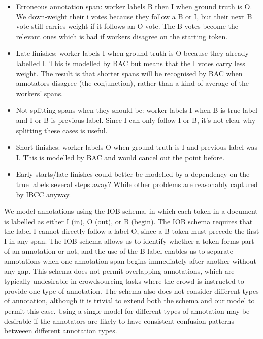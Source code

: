 \begin{itemize}
\item Erroneous annotation span: worker labels B then I when ground truth is O. We down-weight their i votes because they follow a B or I, but their next B vote still carries weight if it follows an O vote. The B votes become the relevant ones which is bad if workers disagree on the starting token.
\item Late finishes: worker labels I when ground truth is O because they already labelled I. This is modelled by BAC but means that the I votes carry less weight. The result is that shorter spans will be recognised by BAC when annotators disagree (the conjunction), 
rather than a kind of average of the workers' spans.
\item Not splitting spans when they should be: worker labels I when B is true label and I or B is previous label. Since I can only follow I or B, it's not clear why splitting these cases is useful.
\item Short finishes: worker labels O when ground truth is I and previous label was I. This is modelled by BAC and would cancel out the point before.
\item Early starts/late finishes could better be modelled by a dependency on the true labels several steps away? While other problems are reasonably captured by IBCC anyway.
\end{itemize}


We model annotations using the IOB schema, in which each token in a document is labelled as either I (in), O (out), or B (begin). The IOB schema requires that the label I cannot directly follow a label O, since a B token must precede the first I in any span. The IOB schema allows us to identify whether a token forms part of an annotation or not, and the use of the B label enables us to separate annotations when one annotation span begins immediately after another without any gap. This schema does not permit overlapping annotations, which are typically undesirable in crowdsourcing tasks where the crowd is instructed to provide one type of annotation. The schema also does not consider different types of annotation, although it is trivial to extend both the schema and our model to permit this case. Using a single model for different types of annotation may be desirable if the annotators are likely to have consistent confusion patterns betweeen different annotation types. 


